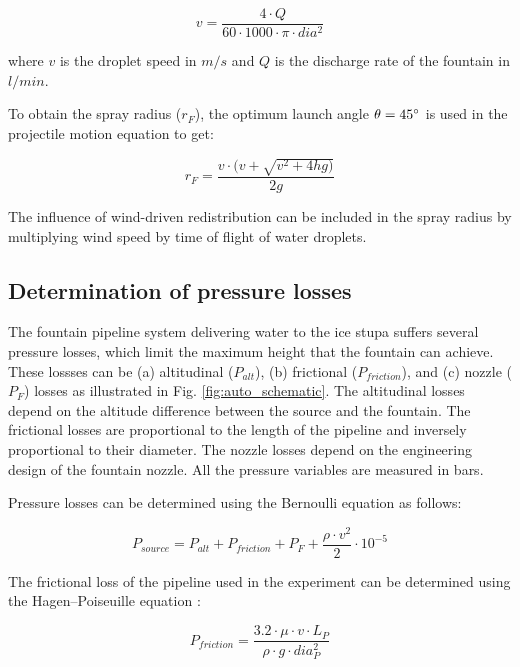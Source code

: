 \documentclass[tc, manuscript]{copernicus}
\begin{document}
\begin{equation}
	\label{eqn:dis}
v = \frac{4 \cdot Q}{60 \cdot 1000 \cdot \pi \cdot dia^2}
\end{equation}

where $v$ is the droplet speed in $m/s$ and $Q$ is the discharge rate of the fountain in $l/min$.

To obtain the spray radius ($r_F$), the optimum launch angle $\theta = 45 ^{\circ}$ is used in the projectile motion
equation to get:

\begin{equation}
  \label{eqn:radf}
  r_F = \frac{v \cdot(v + \sqrt{v^2 + 4hg)}}{2g}
\end{equation}

The influence of wind-driven redistribution can be included in the spray radius by multiplying wind speed
by time of flight of water droplets.

\subsection{Determination of pressure losses} \label{sec:p_loss}

The fountain pipeline system delivering water to the ice stupa suffers several pressure losses, which limit the
maximum height that the fountain can achieve. These lossses can be (a) altitudinal ($P_{alt}$), (b) frictional
($P_{friction}$), and (c) nozzle ($P_{F}$) losses as illustrated in Fig. \ref{fig:auto_schematic}. The
altitudinal losses depend on the altitude difference between the source and the fountain. The frictional losses
are proportional to the length of the pipeline and inversely proportional to their diameter. The nozzle losses
depend on the engineering design of the fountain nozzle. All the pressure variables are measured in bars.

Pressure losses can be determined using the Bernoulli equation as follows:

\begin{equation}
  \label{eqn:pressure}
  P_{source} = P_{alt} + P_{friction} + P_{F} + \frac{\rho \cdot v^2}{2} \cdot 10 ^{-5}
\end{equation}

The frictional loss of the pipeline used in the experiment can be determined using the Hagen–Poiseuille equation
\citep{batchelor2000introduction}:  

\begin{equation}
  \label{eqn:friction}
  P_{friction} = \frac{3.2 \cdot \mu \cdot v \cdot L_P}{\rho \cdot g \cdot dia_P^2}
\end{equation}
\end{document}
